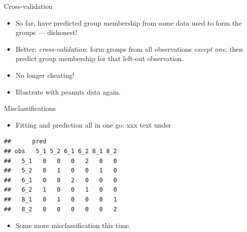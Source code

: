 \documentclass[ignorenonframetext,]{beamer}
\newenvironment{Shaded}{\begin{snugshade}}{\end{snugshade}}
\newcommand{\DataTypeTok}[1]{\textcolor[rgb]{0.13,0.29,0.53}{#1}}
\newcommand{\KeywordTok}[1]{\textcolor[rgb]{0.13,0.29,0.53}{\textbf{#1}}}
\newcommand{\NormalTok}[1]{#1}
\newcommand{\OperatorTok}[1]{\textcolor[rgb]{0.81,0.36,0.00}{\textbf{#1}}}
\newcommand{\StringTok}[1]{\textcolor[rgb]{0.31,0.60,0.02}{#1}}
\providecommand{\tightlist}{%
  \setlength{\itemsep}{0pt}\setlength{\parskip}{0pt}}
\begin{document}
\begin{frame}{Cross-validation}
\protect\hypertarget{cross-validation}{}

\begin{itemize}
\item
  So far, have predicted group membership from same data used to form
  the groups --- dishonest!
\item
  Better: \emph{cross-validation}: form groups from all observations
  \emph{except one}, then predict group membership for that left-out
  observation.
\item
  No longer cheating!
\item
  Illustrate with peanuts data again.
\end{itemize}

\end{frame}

\begin{frame}[fragile]{Misclassifications}
\protect\hypertarget{misclassifications}{}

\begin{itemize}
\tightlist
\item
  Fitting and prediction all in one go: xxx text under
\end{itemize}

\small

\begin{Shaded}
\end{Shaded}

\begin{verbatim}
##      pred
## obs   5_1 5_2 6_1 6_2 8_1 8_2
##   5_1   0   0   0   2   0   0
##   5_2   0   1   0   0   1   0
##   6_1   0   0   2   0   0   0
##   6_2   1   0   0   1   0   0
##   8_1   0   1   0   0   0   1
##   8_2   0   0   0   0   0   2
\end{verbatim}

\normalsize

\begin{itemize}
\tightlist
\item
  Some more misclassification this time.
\end{itemize}

\end{frame}
\end{document}
